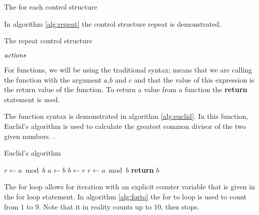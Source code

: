 \begin{algorithm}[H]
  \caption{The for each control structure}
  \label{alg:for-each}
  \begin{algorithmic}[1]
    \EndForEach
  \end{algorithmic}
\end{algorithm}

In algorithm \ref{alg:repeat} the control structure repeat is
demonstrated.

\begin{algorithm}[H]
  \caption{The repeat control structure}
  \label{alg:repeat}
  \begin{algorithmic}[1]
    \State $\mathit{actions}$ 
    \EndRepeatn
  \end{algorithmic}
\end{algorithm}

For functions, we will be using the traditional syntax;
 means that we are calling the function
 with the argument $a$,$b$ and $c$ and that the value
of this expression is the return value of the function. To return a
value from a function the \textbf{return} statement is used.

The function syntax is demonstrated in algorithm \ref{alg:euclid}. In
this function, Euclid's algorithm is used to calculate the greatest
common divisor of the two given numbers.
\cite{cormen2009introduction_to_algo,weisstein:_euclid_algor}.

\begin{algorithm}
  \caption{Euclid's algorithm}
  \label{alg:euclid}
  \begin{algorithmic}[1]
    \State $r\gets a\bmod b$
    \State $a\gets b$
    \State $b\gets r$
    \State $r\gets a\bmod b$
    \EndWhile
    \State \textbf{return} $b$
    \EndProcedure
  \end{algorithmic}
\end{algorithm}

The for loop allows for iteration with an explicit counter variable
that is given in the for loop statement. In algorithm \ref{alg:forto}
the for to loop is used to count from $1$ to $9$. Note that it in
reality counts up to $10$, then stops.

